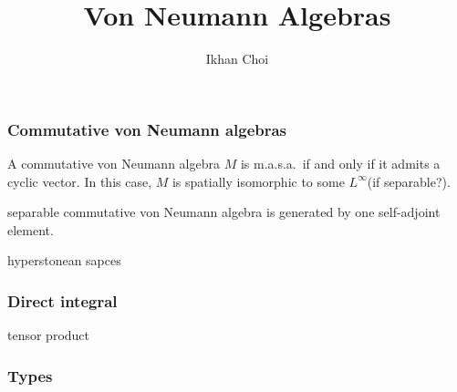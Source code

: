 \documentclass{../../large}
\begin{document}
\title{Von Neumann Algebras}
\author{Ikhan Choi}
\maketitle
\tableofcontents

\iffalse
injectivity
Connes embeddability
Existentially closed II$_1$ factors
property Gamma
Connes' bicentralizer problem
Shlyakhtenko semicircular system
free probability
group stability

Direct integral!
Types!
Traces!

\fi


\part{}


\chapter{}


\section{Commutative von Neumann algebras}


\begin{prb}
A commutative von Neumann algebra $M$ is m.a.s.a.~if and only if it admits a cyclic vector.
In this case, $M$ is spatially isomorphic to some $L^\infty$(if separable?).
\end{prb}

separable commutative von Neumann algebra is generated by one self-adjoint element.

hyperstonean sapces





\section{Direct integral}

\begin{prb}
\end{prb}

tensor product





\section{Types}
\end{document}
